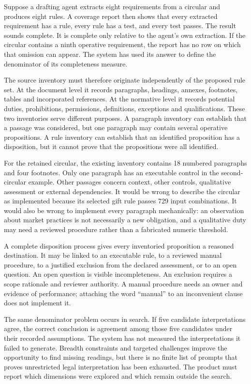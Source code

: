 \documentclass[12pt,a4paper,oneside,openany]{book}
\begin{document}
\label{sec:problem-denominator}
Suppose a drafting agent extracts eight requirements from a circular and produces
eight rules. A coverage report then shows that every extracted requirement has a
rule, every rule has a test, and every test passes. The result sounds complete.
It is complete only relative to the agent's own extraction. If the circular
contains a ninth operative requirement, the report has no row on which that
omission can appear. The system has used its answer to define the denominator
of its completeness measure.

The source inventory must therefore originate independently of the proposed
rule set. At the document level it records paragraphs, headings, annexes,
footnotes, tables and incorporated references. At the normative level it records
potential duties, prohibitions, permissions, definitions, exceptions and
qualifications. These two inventories serve different purposes. A paragraph
inventory can establish that a passage was considered, but one paragraph may
contain several operative propositions. A rule inventory can establish that an
identified proposition has a disposition, but it cannot prove that the
propositions were all identified.

For the retained circular, the existing inventory contains 18 numbered
paragraphs and four footnotes. Only one paragraph has an executable control in
the second-circular example. Other passages concern context, other controls,
qualitative assessment or external dependencies. It would be wrong to describe
the circular as implemented because its selected gift rule passes 729 input
combinations. It would also be wrong to implement every paragraph mechanically:
an observation about market practices is not necessarily a new obligation, and a
qualitative duty may need a reviewed procedure rather than a fabricated numeric
threshold.

A complete disposition process gives every inventoried proposition a reasoned
destination. It may be linked to an executable rule, to a reviewed manual
procedure, to a justified exclusion from the declared assessment, or to an open
question. An open question is visible incompleteness. An exclusion requires a
scope rationale and reviewer authority. A manual procedure needs an owner and
evidence of performance; attaching the word ``manual'' to an inconvenient clause
does not implement it.

The same denominator problem occurs in search. If five candidate interpretations
agree, the correct conclusion is agreement among those five candidates under
their recorded assumptions. The system has not measured the interpretations it
failed to generate. Breadth constraints and targeted challenges improve the
opportunity to find missing readings, but there is no finite list of prompts
that proves unrestricted legal interpretation has been exhausted. The product
must report which dimensions were explored and which remain outside the search.
\end{document}
